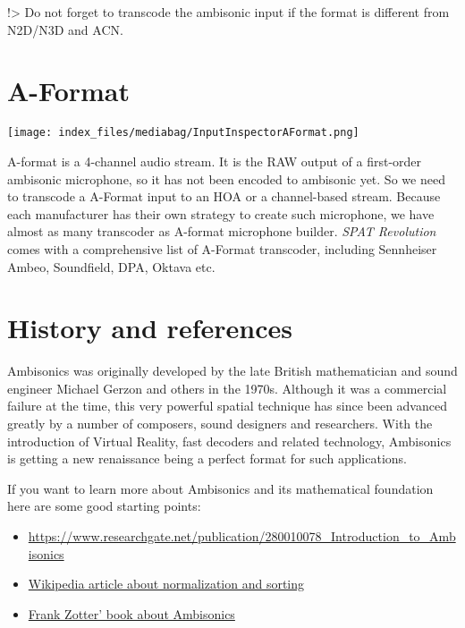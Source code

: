 \documentclass[
  letterpaper,
  DIV=11,
  numbers=noendperiod]{scrreport}
\providecommand{\tightlist}{%
  \setlength{\itemsep}{0pt}\setlength{\parskip}{0pt}}\usepackage{longtable,booktabs,array}
\begin{document}
!\textgreater{} Do not forget to transcode the ambisonic input if the
format is different from N2D/N3D and ACN.

\hypertarget{a-format}{%
\section{A-Format}\label{a-format}}

\texttt{[image: index\_files/mediabag/InputInspectorAFormat.png]}

A-format is a 4-channel audio stream. It is the RAW output of a
first-order ambisonic microphone, so it has not been encoded to
ambisonic yet. So we need to transcode a A-Format input to an HOA or a
channel-based stream. Because each manufacturer has their own strategy
to create such microphone, we have almost as many transcoder as A-format
microphone builder. \emph{SPAT Revolution} comes with a comprehensive
list of A-Format transcoder, including Sennheiser Ambeo, Soundfield,
DPA, Oktava etc.

\hypertarget{history-and-references}{%
\section{History and references}\label{history-and-references}}

Ambisonics was originally developed by the late British mathematician
and sound engineer Michael Gerzon and others in the 1970s. Although it
was a commercial failure at the time, this very powerful spatial
technique has since been advanced greatly by a number of composers,
sound designers and researchers. With the introduction of Virtual
Reality, fast decoders and related technology, Ambisonics is getting a
new renaissance being a perfect format for such applications.

If you want to learn more about Ambisonics and its mathematical
foundation here are some good starting points:

\begin{itemize}
\tightlist
\item
  \url{https://www.researchgate.net/publication/280010078_Introduction_to_Ambisonics}
\item
  \href{https://en.wikipedia.org/wiki/Ambisonic_data_exchange_formats}{Wikipedia
  article about normalization and sorting}
\item
  \href{https://link.springer.com/book/10.1007/978-3-030-17207-7}{Frank
  Zotter' book about Ambisonics}
\end{itemize}
\end{document}
